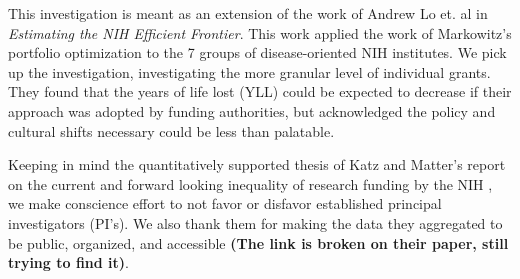 This investigation is meant as an extension of the work of Andrew Lo et. al in \textit{Estimating the NIH Efficient Frontier}\cite{lo_2012}. This work applied the work of Markowitz's portfolio optimization \cite{markowitz} to the 7 groups of disease-oriented NIH institutes. We pick up the investigation, investigating the more granular level of individual grants. They found that the years of life lost (YLL) could be expected to decrease if their approach was adopted by funding authorities, but acknowledged the policy and cultural shifts necessary could be less than palatable. 

Keeping in mind the quantitatively supported thesis of Katz and Matter's report on the current and forward looking inequality of research funding by the NIH \cite{bio_elite}, we make conscience effort to not favor or disfavor established principal investigators (PI's). We also thank them for making the data they aggregated to be public, organized, and accessible \textbf{(The link is broken on their paper, still trying to find it)}.